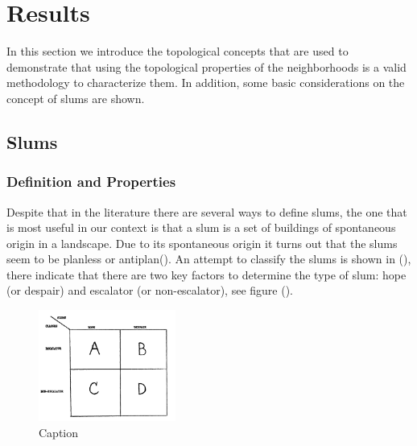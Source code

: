 \documentclass[10pt]{article}
\begin{document}

\section{Results}

In this section we introduce the topological concepts that are used to demonstrate that using the topological properties of the neighborhoods is a valid methodology to characterize them. In addition, some basic considerations on the concept of slums are shown.

\subsection{Slums}
\subsubsection{Definition and Properties}
Despite that in the literature there are several ways to define slums, the one that is most useful in our context is that a slum is a set of buildings of spontaneous origin in a landscape. Due to its spontaneous origin it turns out that the slums seem to be planless or antiplan(). An attempt to classify the slums is shown in (), there indicate that there are two key factors to determine the type of slum: hope (or despair) and escalator (or non-escalator), see figure ().\\

\begin{figure}[h]
    \centering
    \includegraphics[width=0.4\textwidth]{images/img}
    \caption{Caption}
    \label{fig:my_label}
\end{figure}
\end{document}
